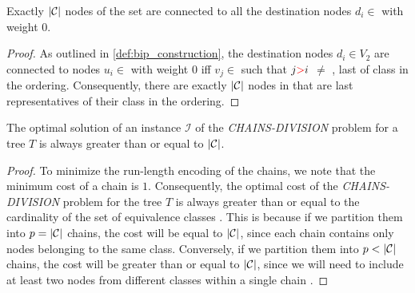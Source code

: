 \begin{lemma} \label{lemma:all_destinations}
    Exactly $|\mathcal{C}|$ nodes of the set  are connected to all the destination nodes $d_i \in$ \destset with weight $0$.
\end{lemma}

\begin{proof}
    As outlined in \cref{def:bip_construction}, the destination nodes $d_i \in V_2$ are connected to nodes $u_i \in$  with weight $0$ iff  $v_j \in$  such that $j {\color{red}{>}} i$    $\neq$ ,  last of  class in the ordering. Consequently, there are exactly $|\mathcal{C}|$ nodes in  that are last representatives of their class in the ordering.
\end{proof}

\begin{lemma} \label{lemma:optimal_cost}
    The optimal solution of an instance $\mathcal{I}$ of the \textit{CHAINS-DIVISION} problem for a tree $T$ is always greater than or equal to $|\mathcal{C}|$.
\end{lemma}

\begin{proof}
    To minimize the run-length encoding of the chains, we note that the minimum cost of a chain is $1$. Consequently, the optimal cost of the \textit{CHAINS-DIVISION} problem for the tree $T$ is always greater than or equal to the cardinality of the set of equivalence classes \equivsetmath. This is because if we partition them into $p = |\mathcal{C}|$ chains, the cost will be equal to $|\mathcal{C}|$, since each chain contains only nodes belonging to the same class. Conversely, if we partition them into $p < |\mathcal{C}|$ chains, the cost will be greater than or equal to $|\mathcal{C}|$, since we will need to include at least two nodes from different classes within a single chain .
\end{proof}

